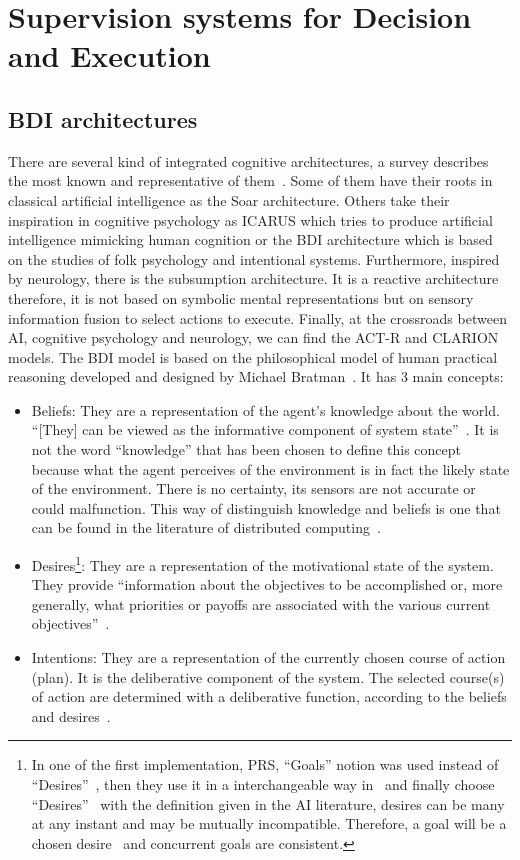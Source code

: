\documentclass[a4paper,11pt,twoside]{StyleThese}
\begin{document}
\section{Supervision systems for Decision and Execution}

\subsection{BDI architectures}
There are several kind of integrated cognitive architectures, a survey describes the most known and representative of them~\cite{chong_2007_integrated}. Some of them have their roots in classical artificial intelligence as the Soar architecture. Others take their inspiration in cognitive psychology as ICARUS  which tries to produce artificial intelligence mimicking human cognition or the BDI architecture which is based on the studies of folk psychology and intentional systems. Furthermore, inspired by neurology, there is the subsumption architecture. It is a reactive architecture therefore, it is not based on symbolic mental representations but on sensory information fusion to select actions to execute. Finally, at the crossroads between AI, cognitive psychology and neurology, we can find the ACT-R and CLARION models.	
The BDI model is based on the philosophical model of human practical reasoning developed and designed by Michael Bratman~\cite{bratman_1987_intention,bratman_1988_plans}. It has 3 main concepts:
\begin{itemize}
	\item Beliefs: They are a representation of the agent’s knowledge about the world. ``[They] can be viewed as the informative component of system state''~\cite{rao_1995_bdi}. It is not the word ``knowledge'' that has been chosen to define this concept because what the agent perceives of the environment is in fact the likely state of the environment. There is no certainty, its sensors are not accurate or could malfunction. This way of distinguish knowledge and beliefs is one that can be found in the literature of distributed computing~\cite{lamarre_1994_knowledge}.
	\item Desires\footnote{In one of the first implementation, PRS, ``Goals'' notion was used instead of ``Desires''~\cite{georgeff_1989_decision}, then they use it in a interchangeable way in~\cite{georgeff_1991_modeling} and finally choose ``Desires''~\cite{rao_1995_bdi} with the definition given in the AI literature, \eg desires can be many at any instant and may be mutually incompatible. Therefore, a goal will be a chosen desire~\cite{cohen_1990_intention} and concurrent goals are consistent.}: They are a representation of the motivational state of the system. They provide ``information about the objectives to be accomplished or, more generally, what priorities or payoffs are associated with the various current objectives''~\cite{rao_1995_bdi}. 
	\item Intentions: They are a representation of the currently chosen course of action (plan). It is the deliberative component of the system. The selected course(s) of action are determined with a deliberative function, according to the beliefs and desires~\cite{rao_1995_bdi}.
\end{itemize}
\end{document}
